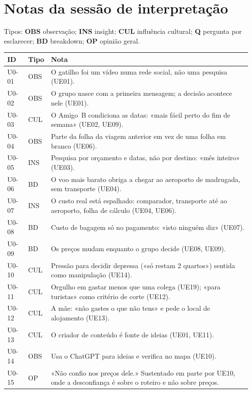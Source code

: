 \documentclass[11pt,a4paper]{article}
\begin{document}
\section{Notas da sessão de interpretação}
Tipos: \textbf{OBS} observação; \textbf{INS} insight; \textbf{CUL} influência cultural; \textbf{Q} pergunta por esclarecer; \textbf{BD} breakdown; \textbf{OP} opinião geral.

{\small
\begin{longtable}{@{}p{1.5cm}p{1.1cm}p{11.8cm}@{}}
\toprule
\textbf{ID} & \textbf{Tipo} & \textbf{Nota} \\ \midrule \endhead
U0-01 & OBS & O gatilho foi um vídeo numa rede social, não uma pesquisa (UE01). \\
U0-02 & OBS & O grupo nasce com a primeira mensagem; a decisão acontece nele (UE01). \\
U0-03 & CUL & O Amigo~B condiciona as datas: «mais fácil perto do fim de semana» (UE02, UE09). \\
U0-04 & OBS & Parte da folha da viagem anterior em vez de uma folha em branco (UE06). \\
U0-05 & INS & Pesquisa por orçamento e datas, não por destino: «mês inteiro» (UE03). \\
U0-06 & BD & O voo mais barato obriga a chegar ao aeroporto de madrugada, sem transporte (UE04). \\
U0-07 & INS & O custo real está espalhado: comparador, transporte até ao aeroporto, folha de cálculo (UE04, UE06). \\
U0-08 & BD & Custo de bagagem só no pagamento: «isto ninguém diz» (UE07). \\
U0-09 & BD & Os preços mudam enquanto o grupo decide (UE08, UE09). \\
U0-10 & CUL & Pressão para decidir depressa («só restam 2 quartos») sentida como manipulação (UE14). \\
U0-11 & CUL & Orgulho em gastar menos que uma colega (UE19); «para turistas» como critério de corte (UE12). \\
U0-12 & CUL & A mãe: «não gastes o que não tens» e pede o local de alojamento (UE13). \\
U0-13 & CUL & O criador de conteúdo é fonte de ideias (UE01, UE11). \\
U0-14 & OBS & Usa o ChatGPT para ideias e verifica no mapa (UE10). \\
U0-15 & OP & «Não confio nos preços dele.» Sustentado em parte por UE10, onde a desconfiança é sobre o roteiro e não sobre preços. \\

\end{longtable}}
\end{document}
